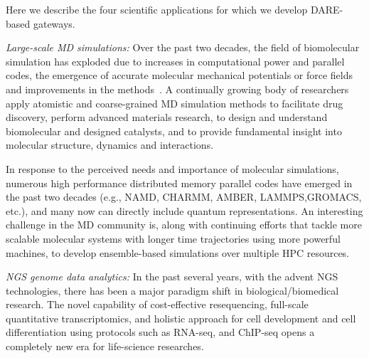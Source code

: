\documentclass{sig-alternate}
\begin{document}
Here we describe the four scientific applications for which we develop
DARE-based gateways.


\textit{Large-scale MD simulations:} Over the past two
decades, the field of biomolecular simulation has exploded due to
increases in computational power and parallel codes, the emergence of
accurate molecular mechanical potentials or force fields and
improvements in the methods~\cite{adcock2006}. 
A continually growing body of researchers apply atomistic and
coarse-grained MD simulation methods to facilitate drug discovery,
perform advanced materials research, to design and understand
biomolecular and designed catalysts, and to provide fundamental
insight into molecular structure, dynamics and interactions.


In response to the perceived needs and importance of molecular
simulations, numerous high performance distributed memory parallel
codes have emerged in the past two decades (e.g., NAMD, CHARMM,
AMBER, LAMMPS,GROMACS, etc.), and many now can directly include
quantum representations.  An interesting challenge in the MD community
is, along with continuing efforts that tackle more scalable molecular
systems with longer time trajectories using more powerful machines, to
develop ensemble-based simulations over multiple HPC resources.

\textit{NGS genome data analytics:} In the past several years, with
the advent NGS technologies\cite{mardis2008-tig,metzker2010}, there
has been a major paradigm shift in biological/biomedical research.
The novel capability of cost-effective resequencing, full-scale
quantitative transcriptomics, and holistic approach for cell
development and cell differentiation using protocols such as RNA-seq,
and ChIP-seq opens a completely new era for life-science
researches\cite{sorek2010}.  
\end{document}
